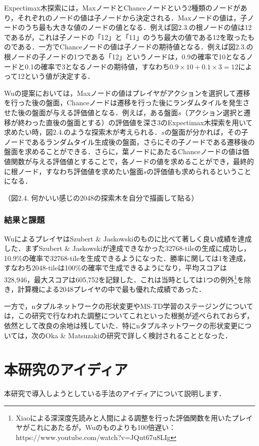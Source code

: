 \documentclass{suribt}
\begin{document}
Expectimax木探索には，MaxノードとChanceノードという2種類のノードがあり，それぞれのノードの値は子ノードから決定される．Maxノードの値は，子ノードのうち最も大きな値のノードの値となる．例えば図2.3.の根ノードの値は12であるが，これは子ノードの「12」と「11」のうち最大の値である12を取ったものである．一方でChanceノードの値は子ノードの期待値となる．例えば図2.3.の根ノードの子ノードの1つである「12」というノードは，0.9の確率で10となるノードと0.1の確率で3となるノードの期待値，すなわち$0.9 \times 10 + 0.1 \times 3 = 12$によって12という値が決定する．

Wuの提案においては，Maxノードの値はプレイヤがアクションを選択して遷移を行った後の盤面，Chanceノードは遷移を行った後にランダムタイルを発生させた後の盤面が与える評価値となる．例えば，ある盤面$s$（アクション選択と遷移が終わった直後の盤面とする）の評価値を深さ3のExpectimax木探索を用いて求めたい時，図2.4.のような探索木が考えられる．$s$の盤面が分かれば，その子ノードであるランダムタイル生成後の盤面，さらにその子ノードである遷移後の盤面を求めることができる．さらに，葉ノードにあたるChanceノードの値は価値関数が与える評価値とすることで，各ノードの値を求めることができ，最終的に根ノード，すなわち評価値を求めたい盤面$s$の評価値も求められるということになる．

（図2.4. 何かいい感じの2048の探索木を自分で描画して貼る）

\subsection{結果と課題}
WuによるプレイヤはSzubert \& Jaskowskiのものに比べて著しく良い成績を達成した．まずSzubert \& Jaskowskiが達成できなかった32768-tileの生成に成功し，10.9\%の確率で32768-tileを生成できるようになった．勝率に関しては1を達成，すなわち2048-tileは100\%の確率で生成できるようになり，平均スコアは328,946，最大スコアは605,752を記録した．これは当時としては1つの例外\footnote{Xiaoによる深深度先読みと人間による調整を行った評価関数を用いたプレイヤがこれにあたるが，Wuのものよりも100倍遅い：https://www.youtube.com/watch?v=JQut67u8LIg}を除き，計算機による2048プレイヤの中で最も優れた成績であった．

一方で，nタプルネットワークの形状変更やMS-TD学習のステージングについては，この研究で行なわれた調整についてこれといった根拠が述べられておらず，依然として改良の余地は残していた．特にnタプルネットワークの形状変更については，次のOka \& Matsuzakiの研究で詳しく検討されることとなった．

\chapter{本研究のアイディア}
本研究で導入しようとしている手法のアイディアについて説明します．
\end{document}
